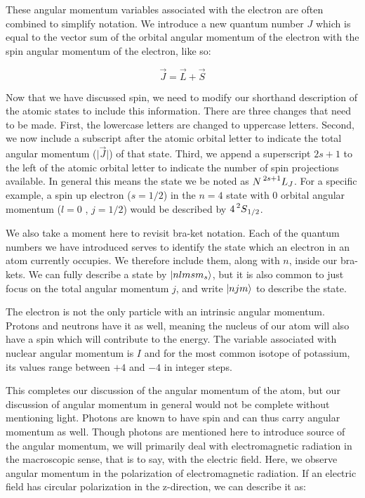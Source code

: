 \documentclass[12pt]{article}
\begin{document}
        These angular momentum variables associated with the
        electron are often combined to simplify notation. We
        introduce a new quantum number $J$ which is equal to
        the vector sum of the orbital angular momentum of the
        electron with the spin angular momentum of the electron,
        like so: 

        \begin{equation}
            \vec{J} = \vec{L} + \vec{S}
        \end{equation}

        Now that we have discussed spin, we need to modify our 
        shorthand description of the atomic states to include
        this information. There are three changes that need to 
		be made. First, the lowercase letters are changed to
		uppercase letters. Second, we now include a subscript after
        the atomic orbital letter to indicate the total angular
        momentum ($\vert\vec{J}\vert$) of that state. 
		Third, we append a superscript $2s+1$ to the left of
		the atomic orbital letter to indicate the number of
		spin projections available. In general
		this means the state we be noted as $N\prescript{2s+1}{}L_{J}$. For 
		a specific example, 
        a spin up electron ($s=1/2$) in the $n=4$ state with 
        0 orbital angular momentum ($l=0$ , $j=1/2$) would be 
        described by $4\prescript{2}{}S_{1/2}$.

		We also take a moment here to revisit bra-ket notation.
		Each of the quantum numbers we have introduced serves
		to identify the state which an electron in an atom 
		currently occupies. We therefore include them, along with
		$n$, inside our bra-kets. We can fully describe a state by
		$\ket{nlmsm_s}$, but it is also common to just focus on
		the total angular momentum $j$, and write $\ket{njm}$ to
		describe the state.

        The electron is not the only particle with an intrinsic
        angular momentum. Protons and neutrons have it as well,
        meaning the nucleus of our atom will also have a
        spin which will contribute to the energy. The variable
        associated with nuclear angular momentum is $I$ and
        for the most common isotope of potassium, its values
        range between $+4$ and $-4$ in integer steps. 
	
		This completes our discussion of the angular momentum
		of the atom, but our discussion of angular momentum in 
		general would not be complete without mentioning light.
		Photons are known to have spin and can thus carry 
		angular momentum as well. Though photons are mentioned
		here to introduce source of the angular momentum,
		we will primarily deal with
		electromagnetic radiation in the macroscopic sense, 
		that is to say, with the electric field. Here, we 
		observe angular momentum in the polarization of 
		electromagnetic radiation. If an electric field has
		circular polarization in the z-direction, we can 
		describe it as:
\end{document}
